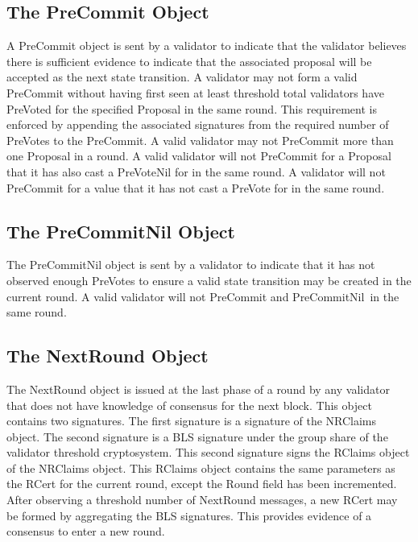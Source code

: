 \subsection{The PreCommit Object}



A PreCommit object is sent by a validator to indicate that the
validator believes there is sufficient evidence to indicate that the
associated proposal will be accepted as the next state transition.
A validator may not form a valid PreCommit without having first seen at
least threshold total validators have PreVoted for the specified
Proposal in the same round.
This requirement is enforced by appending the associated signatures
from the required number of PreVotes to the PreCommit.
A valid validator may not PreCommit more than one Proposal in a round.
A valid validator will not PreCommit for a Proposal that it has also
cast a PreVoteNil for in the same round.
A validator will not PreCommit for a value that it has not cast a
PreVote for in the same round.

\subsection{The PreCommitNil Object}



The PreCommitNil object is sent by a validator to indicate that it has
not observed enough PreVotes to ensure a valid state transition may be
created in the current round.
A valid validator will not PreCommit and PreCommitNil\ in the same
round.


\subsection{The NextRound Object}



The NextRound object is issued at the last phase of a round by any
validator that does not have knowledge of consensus for the next block.
This object contains two signatures.
The first signature is a \secp{} signature of the NRClaims object.
The second signature is a BLS signature under the group share of the
validator threshold cryptosystem.
This second signature signs the RClaims object of the NRClaims object.
This RClaims object contains the same parameters as the RCert for the
current round, except the Round field has been incremented.
After observing a threshold number of NextRound messages, a new RCert
may be formed by aggregating the BLS signatures.
This provides evidence of a consensus to enter a new round.



